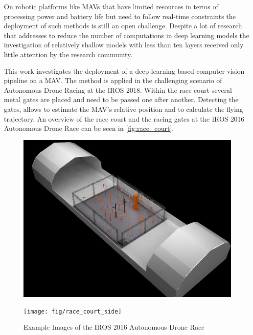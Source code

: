 On robotic platforms like \acp{MAV} that have limited resources in terms of processing power and battery life but need to follow real-time constraints the deployment of such methods is still an open challenge. Despite a lot of research that addresses to reduce the number of computations in deep learning models \cite{YoungwanLee, Zagoruyko2016, Howard2017, Ghosh2017, Sandler2018, Zhang2017a} the investigation of relatively shallow models with less than ten layers received only little attention by the research community.

This work investigates the deployment of a deep learning based computer vision pipeline on a \ac{MAV}. The method is applied in the challenging scenario of Autonomous Drone Racing at the \ac{IROS} 2018. Within the race court several metal gates are placed and need to be passed one after another. Detecting the gates, allows to estimate the \ac{MAV}'s relative position and to calculate the flying trajectory. An overview of the race court and the racing gates at the \ac{IROS} 2016 Autonomous Drone Race can be seen in \autoref{fig:race_court}.

\begin{figure}[bhtp]
	\centering
	\begin{minipage}{0.45\linewidth}
	\includegraphics[width=\textwidth]{fig/race_court}
	\end{minipage}\hfill
\begin{minipage}{0.45\linewidth}
	\texttt{[image: fig/race\_court\_side]}
\end{minipage}
\caption{Example Images of the \ac{IROS} 2016 Autonomous Drone Race}
\label{fig:race_court}
\end{figure}

